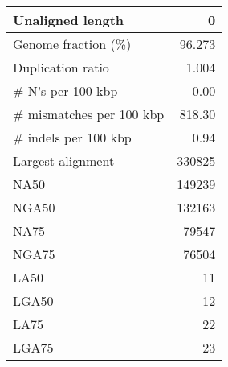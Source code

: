 \documentclass[12pt,a4paper]{article}
\begin{document}
\begin{table}[ht]
\begin{center}
\begin{tabular}{|l*{1}{|r}|}
Unaligned length & 0 \\ \hline
Genome fraction (\%) & 96.273 \\ \hline
Duplication ratio & 1.004 \\ \hline
\# N's per 100 kbp & 0.00 \\ \hline
\# mismatches per 100 kbp & 818.30 \\ \hline
\# indels per 100 kbp & 0.94 \\ \hline
Largest alignment & 330825 \\ \hline
NA50 & 149239 \\ \hline
NGA50 & 132163 \\ \hline
NA75 & 79547 \\ \hline
NGA75 & 76504 \\ \hline
LA50 & 11 \\ \hline
LGA50 & 12 \\ \hline
LA75 & 22 \\ \hline
LGA75 & 23 \\ \hline
\end{tabular}
\end{center}
\end{table}
\end{document}
